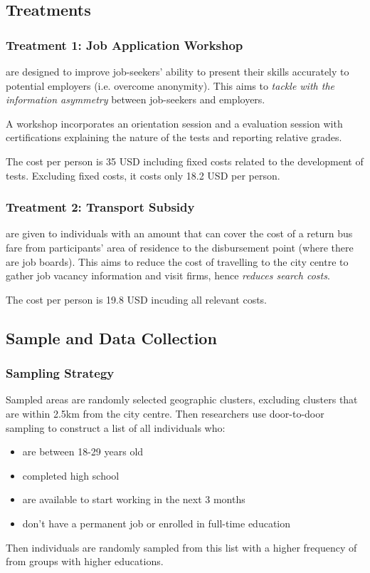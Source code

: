     \subsection{Treatments}
    
        \subsubsection{Treatment 1: Job Application Workshop}
             are designed to improve job-seekers' ability to present their skills accurately to potential employers (i.e. overcome anonymity). This aims to \emph{tackle with the information asymmetry} between job-seekers and employers.\par
            A workshop incorporates an orientation session and a evaluation session with certifications explaining the nature of the tests and reporting relative grades.\par
            The cost per person is 35 USD including fixed costs related to the development of tests. Excluding fixed costs, it costs only 18.2 USD per person.
            
        \subsubsection{Treatment 2: Transport Subsidy}
             are given to individuals with an amount that can cover the cost of a return bus fare from participants' area of residence to the disbursement point (where there are job boards). This aims to reduce the cost of travelling to the city centre to gather job vacancy information and visit firms, hence \emph{reduces search costs}.\par
            The cost per person is 19.8 USD incuding all relevant costs.
            
    \subsection{Sample and Data Collection}
    
        \subsubsection{Sampling Strategy}
            Sampled areas are randomly selected geographic clusters, excluding clusters that are within 2.5km from the city centre. Then researchers use door-to-door sampling to construct a list of all individuals who:
            \begin{itemize}
                \item are between 18-29 years old
                \item completed high school
                \item are available to start working in the next 3 months
                \item don't have a permanent job or enrolled in full-time education
            \end{itemize}
            Then individuals are randomly sampled from this list with a higher frequency of from groups with higher educations.
            
